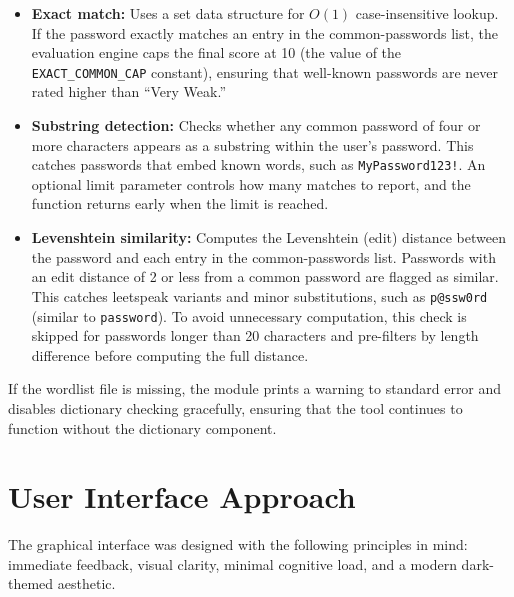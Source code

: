 \begin{itemize}
    \item \textbf{Exact match:} Uses a set data structure for $O(1)$ case-insensitive lookup. If the password exactly matches an entry in the common-passwords list, the evaluation engine caps the final score at 10 (the value of the \texttt{EXACT\_COMMON\_CAP} constant), ensuring that well-known passwords are never rated higher than ``Very Weak.''

    \item \textbf{Substring detection:} Checks whether any common password of four or more characters appears as a substring within the user's password. This catches passwords that embed known words, such as \texttt{MyPassword123!}. An optional limit parameter controls how many matches to report, and the function returns early when the limit is reached.

    \item \textbf{Levenshtein similarity:} Computes the Levenshtein (edit) distance between the password and each entry in the common-passwords list. Passwords with an edit distance of 2 or less from a common password are flagged as similar. This catches leetspeak variants and minor substitutions, such as \texttt{p@ssw0rd} (similar to \texttt{password}). To avoid unnecessary computation, this check is skipped for passwords longer than 20 characters and pre-filters by length difference before computing the full distance.
\end{itemize}

If the wordlist file is missing, the module prints a warning to standard error and disables dictionary checking gracefully, ensuring that the tool continues to function without the dictionary component.

\clearpage

\section{User Interface Approach}

The graphical interface was designed with the following principles in mind: immediate feedback, visual clarity, minimal cognitive load, and a modern dark-themed aesthetic.

